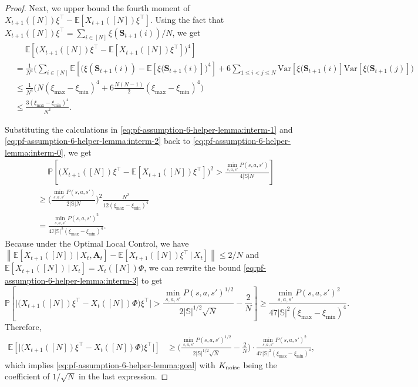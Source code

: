 \documentclass[11pt,letterpaper]{article}
\theoremstyle{plain}
\theoremstyle{definition}
\theoremstyle{remark}
\newcommand{\norm}[1]{\left\lVert#1\right\rVert}
\newcommand{\E}[1]{\mathbb{E}\left[#1\right]}
\newcommand{\Eplain}[1]{\mathbb{E}[#1]}
\newcommand{\givenplain}{\,|\,}
\newcommand{\Var}[1]{\text{Var}{\left[#1\right]}}
\newcommand{\Prob}[1]{\mathbb{P}\left[#1\right]}
\newcommand{\absbig}[1]{\big\lvert#1\big\rvert}
\newcommand{\ve}[1]{\bm{#1}}
\newcommand{\veS}{\ve{S}}
\newcommand{\veA}{\ve{A}}
\newcommand{\sspa}{\mathbb{S}}
\newcommand{\sumN}{\sum_{i\in[N]}}
\newcommand{\noiseortho}{K_{\textup{noise}}}
\newcommand{\ximax}{\xi_{\max}}
\newcommand{\ximin}{\xi_{\min}}
\begin{document}
\begin{proof}
    Next, we upper bound the fourth moment of $X_{t+1}([N]) \xi^\top -\Eplain{X_{t+1}([N]) \xi^\top}$. Using the fact that $X_{t+1}([N]) \xi^\top = \sumN \xi(\veS_{t+1}(i)) / N$, we get 
    \begin{align}
        \nonumber
        &\mspace{23mu} \E{\big(X_{t+1}([N]) \xi^\top -\Eplain{X_{t+1}([N]) \xi^\top}\big)^4} \\
        \nonumber
        &= \frac{1}{N^4} \Big( \sumN \E{\big(\xi(\veS_{t+1}(i)) - \E{\xi(\veS_{t+1}(i)}\big)^4}
        + 6 \sum_{1\leq i < j \leq N} \Var{\xi(\veS_{t+1}(i)} \Var{\xi(\veS_{t+1}(j)}
        \Big) \\
        \nonumber
        &\leq \frac{1}{N^4}\Big(N (\ximax - \ximin)^4 + 6 \frac{N(N-1)}{2} (\ximax - \ximin)^4 \Big) \\
        \label{eq:pf-assumption-6-helper-lemma:interm-2}
        &\leq \frac{3(\ximax-\ximin)^4}{N^2}.
    \end{align}
    
    Substituting the calculations in \eqref{eq:pf-assumption-6-helper-lemma:interm-1} and \eqref{eq:pf-assumption-6-helper-lemma:interm-2} back to \eqref{eq:pf-assumption-6-helper-lemma:interm-0}, we get
    \begin{align}
        \nonumber
        &\mspace{23mu} \Prob{\big(X_{t+1}([N]) \xi^\top -\Eplain{X_{t+1}([N]) \xi^\top}\big)^2  >  \frac{\min_{s,a,s'} P(s,a,s')}{4|\sspa|N}} \\
        \nonumber
        &\geq \Big(\frac{\min_{s,a,s'} P(s,a,s')}{2|\sspa|N}\Big)^2  \frac{N^2}{12(\ximax-\ximin)^4} \\
         \label{eq:pf-assumption-6-helper-lemma:interm-3}
        &= \frac{\min_{s,a,s'} P(s,a,s')^2}{47|\sspa|^2 (\ximax-\ximin)^4}. 
    \end{align}
    Because under the Optimal Local Control, we have $\norm{\Eplain{X_{t+1}([N]) \givenplain X_t, \veA_t} - \Eplain{X_{t+1}([N]) \xi^\top \givenplain X_t}} \leq 2/N$ and $\Eplain{X_{t+1}([N]) \givenplain X_t} = X_t([N]) \Phi$, we can rewrite the bound \eqref{eq:pf-assumption-6-helper-lemma:interm-3} to get
    \[
        \Prob{\absbig{\big(X_{t+1}([N]) \xi^\top - X_t([N]) \Phi \big)\xi^\top} >  \frac{\min_{s,a,s'} P(s,a,s')^{1/2}}{2|\sspa|^{1/2} \sqrt{N}} - \frac{2}{N} } \geq \frac{\min_{s,a,s'} P(s,a,s')^2}{47|\sspa|^2 (\ximax-\ximin)^4}.
    \]
    Therefore, 
    \begin{align*}
        \E{\absbig{\big(X_{t+1}([N]) \xi^\top - X_t([N]) \Phi \big)\xi^\top}} 
        &\geq  \Big(\frac{\min_{s,a,s'} P(s,a,s')^{1/2}}{2|\sspa|^{1/2} \sqrt{N}} - \frac{2}{N} \Big)\cdot \frac{\min_{s,a,s'} P(s,a,s')^2}{47|\sspa|^2 (\ximax-\ximin)^4},
    \end{align*}
    which implies \eqref{eq:pf-assumption-6-helper-lemma:goal} with $\noiseortho$ being the coefficient of $1/\sqrt{N}$ in the last expression. 
\end{proof}
\end{document}
